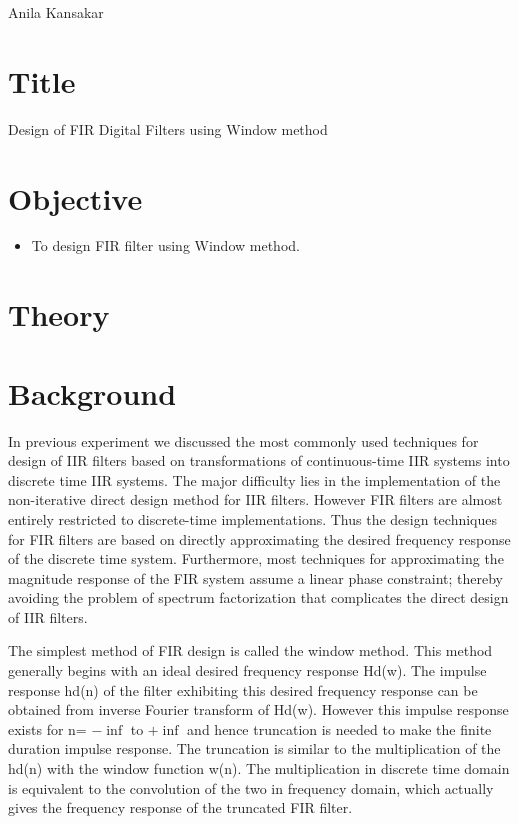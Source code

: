 \documentclass[a4paper,11pt]{article}
\begin{document}
{Anila  Kansakar}

\renewcommand{\contentsname}{Table of Contents}
\tableofcontents

\pagebreak
\lstlistoflistings
\vspace{10em}
\listoffigures
\pagebreak
{}

\section{Title} {\large Design of FIR Digital Filters using Window method}
\section{Objective}
\begin {itemize}
\item To design FIR filter using Window method.
\end{itemize}


\section{Theory}

\section{Background}
In previous experiment we discussed the most commonly used techniques for design of IIR
filters based on transformations of continuous-time IIR systems into discrete time IIR systems.
The major difficulty lies in the implementation of the non-iterative direct design method for IIR
filters. However FIR filters are almost entirely restricted to discrete-time implementations. Thus
the design techniques for FIR filters are based on directly approximating the desired frequency
response of the discrete time system. Furthermore, most techniques for approximating the
magnitude response of the FIR system assume a linear phase constraint; thereby avoiding the
problem of spectrum factorization that complicates the direct design of IIR filters.

The simplest method of FIR design is called the window method. This method generally begins
with an ideal desired frequency response Hd(w). The impulse response hd(n) of the filter
exhibiting this desired frequency response can be obtained from inverse Fourier transform of
Hd(w). However this impulse response exists for n= $-\inf$ to $+\inf$ and hence truncation is needed to
make the finite duration impulse response. The truncation is similar to the multiplication of the
hd(n) with the window function w(n). The multiplication in discrete time domain is equivalent to
the convolution of the two in frequency domain, which actually gives the frequency response of
the truncated FIR filter.
\end{document}
